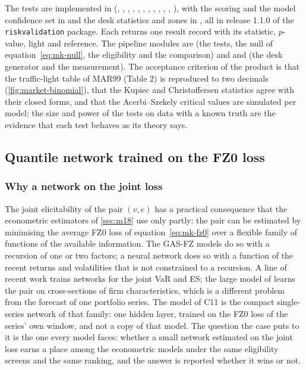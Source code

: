 The tests are implemented in  (, ,
, , , , ,
, , , , ), with the scoring
and the model confidence set in  and the desk statistics and zones in , all in release 1.1.0 of the
\texttt{riskvalidation} package. Each returns one result record with its statistic, $p$-value, light and reference. The pipeline modules are
 (the tests, the null of equation~\eqref{eq:mk-null}, the eligibility and the comparison) and
 and  (the desk generator and the measurement). The acceptance criterion of the product is that the traffic-light table of MAR99 (Table 2)
is reproduced to two decimals (\cref{fig:market-binomial}), that the Kupiec and Christoffersen statistics agree with their closed forms, and that the Acerbi--Szekely critical values are simulated per
model; the size and power of the tests on data with a known truth are the evidence that each test behaves as its theory says.



\subsection{Quantile network trained on the FZ0 loss}
\label{sec:m30}

\subsubsection{Why a network on the joint loss}
The joint elicitability of the pair $(v,e)$ \citep{market:fisslerziegel2016} has a practical consequence that the econometric estimators of \cref{sec:m18} use only partly: the pair can be estimated by minimising
the average FZ0 loss of equation~\eqref{eq:mk-fz0} over a flexible family of functions of the available information. The GAS-FZ models do so with a recursion of one or two
factors; a neural network does so with a function of the recent returns and volatilities that is not constrained to a recursion. A line of recent work trains networks for the joint VaR
and ES; the large model of \citet{market:zhang2026resga} learns the pair on cross-sections of firm characteristics, which is a different problem from the forecast of one portfolio series. The
model of C11 is the compact single-series network of that family: one hidden layer, trained on the FZ0 loss of the series' own window, and not a copy of that model. The question the case puts to it is the one
every model faces: whether a small network estimated on the joint loss earns a place among the econometric models under the same eligibility screens and the same ranking, and the answer is
reported whether it wins or not.

